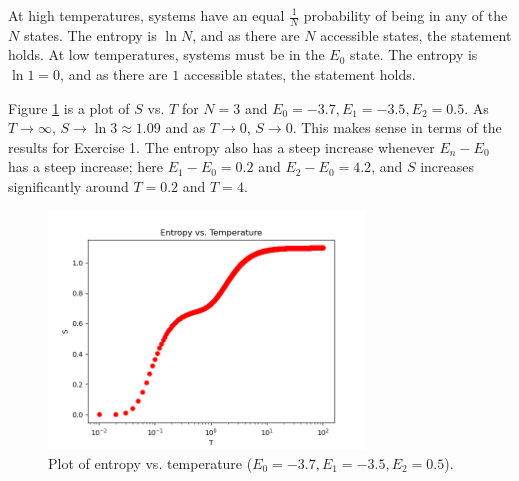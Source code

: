 \documentclass{article}
\begin{document}
\clearpage

\problem
At high temperatures, systems have an equal $\frac{1}{N}$ probability of being in any of the $N$ states. The entropy is $\ln N$, and as there are $N$ accessible states, the statement holds. At low temperatures, systems must be in the $E_0$ state. The entropy is $\ln 1 = 0$, and as there are $1$ accessible states, the statement holds.

\clearpage

\skipproblem

\problem
Figure \ref{fig:fig1} is a plot of $S$ vs. $T$ for $N = 3$ and $E_0 = -3.7, E_1 = -3.5, E_2 = 0.5$. As $T \to \infty$, $S \to \ln 3 \approx 1.09$ and as $T \to 0$, $S \to 0$. This makes sense in terms of the results for Exercise 1. The entropy also has a steep increase whenever $E_n - E_0$ has a steep increase; here $E_1 - E_0 = 0.2$ and $E_2 - E_0 = 4.2$, and $S$ increases significantly around $T = 0.2$ and $T = 4$.
\begin{figure}[!htb]
    \centering
    \includegraphics[width=0.75\textwidth]{../code/phy112l_lab2/2-4.png}
    \caption{Plot of entropy vs. temperature ($E_0 = -3.7, E_1 = -3.5, E_2 = 0.5$).}
    \label{fig:fig1}
\end{figure}

\clearpage
\end{document}
